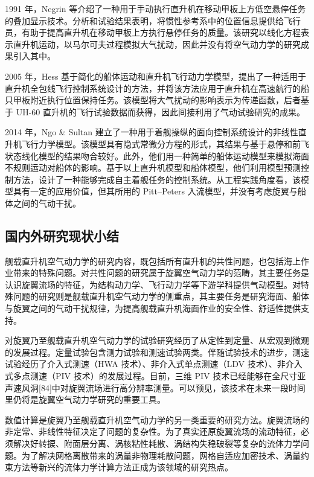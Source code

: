1991 年，Negrin 等介绍了一种用于手动执行直升机在移动甲板上方低空悬停任务的叠加显示技术。分析和试验结果表明，将惯性参考系中的位置信息提供给飞行员，有助于提高直升机在移动甲板上方执行悬停任务的质量。该研究以线化方程表示直升机运动，以马尔可夫过程模拟大气扰动，因此并没有将空气动力学的研究成果引入其中。

2005 年，Hess 基于简化的船体运动和直升机飞行动力学模型，提出了一种适用于直升机全包线飞行控制系统设计的方法，并将该方法应用于直升机在高速航行的船只甲板附近执行位置保持任务。该模型将大气扰动的影响表示为传递函数，后者基于
UH-60 直升机的飞行试验数据而获得，因此间接利用了气动试验研究的成果。 

2014 年，Ngo \& Sultan 建立了一种用于着舰操纵的面向控制系统设计的非线性直升机飞行力学模型。该模型具有隐式常微分方程的形式，其结果与基于悬停和前飞状态线化模型的结果吻合较好。此外，他们用一种简单的船体运动模型来模拟海面不规则运动对船体的影响。基于以上直升机模型和船体模型，他们利用模型预测控制方法，设计了一种能够完成自主着舰任务的控制系统。从工程实践角度看，该模型具有一定的应用价值，但其所用的
Pitt–Peters 入流模型，并没有考虑旋翼与船体之间的气动干扰。

\subsection{国内外研究现状小结}

舰载直升机空气动力学的研究内容，既包括所有直升机的共性问题，也包括海上作业带来的特殊问题。对共性问题的研究属于旋翼空气动力学的范畴，其主要任务是认识旋翼流场的特征，为结构动力学、飞行动力学等下游学科提供气动模型。对特殊问题的研究则是舰载直升机空气动力学的侧重点，其主要任务是研究海面、船体与旋翼之间的气动干扰规律，为提高舰载直升机海面作业的安全性、舒适性提供支持。

对旋翼乃至舰载直升机空气动力学的试验研究经历了从定性到定量、从宏观到微观的发展过程。定量试验包含测力试验和测速试验两类。伴随试验技术的进步，测速试验经历了介入式测速（HWA
技术）、非介入式单点测速（LDV 技术）、非介入式多点测速（PIV 技术）的发展过程。目前，三维 PIV 技术已经能够在全尺寸亚声速风洞{[}84{]}中对旋翼流场进行高分辨率测量。可以预见，该技术在未来一段时间里仍将是旋翼空气动力学研究的重要工具。

数值计算是旋翼乃至舰载直升机空气动力学的另一类重要的研究方法。旋翼流场的非定常、非线性特征决定了问题的复杂性。为了真实还原旋翼流场的流动特征，必须解决好转捩、附面层分离、涡核粘性耗散、涡结构失稳破裂等复杂的流体力学问题。为了解决网格离散带来的涡量非物理耗散问题，网格自适应加密技术、涡量约束方法等新兴的流体力学计算方法正成为该领域的研究热点。

